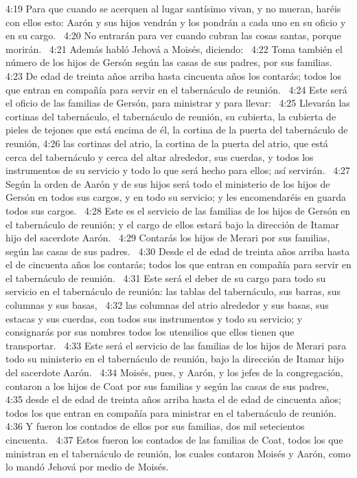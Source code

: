 4:19 Para que cuando se acerquen al lugar santísimo vivan, y no mueran, haréis con ellos esto: Aarón y sus hijos vendrán y los pondrán a cada uno en su oficio y en su cargo.  
4:20 No entrarán para ver cuando cubran las cosas santas, porque morirán.  
4:21 Además habló Jehová a Moisés, diciendo:  
4:22 Toma también el número de los hijos de Gersón según las casas de sus padres, por sus familias.  
4:23 De edad de treinta años arriba hasta cincuenta años los contarás; todos los que entran en compañía para servir en el tabernáculo de reunión.  
4:24 Este será el oficio de las familias de Gersón, para ministrar y para llevar:  
4:25 Llevarán las cortinas del tabernáculo, el tabernáculo de reunión, su cubierta, la cubierta de pieles de tejones que está encima de él, la cortina de la puerta del tabernáculo de reunión, 
4:26 las cortinas del atrio, la cortina de la puerta del atrio, que está cerca del tabernáculo y cerca del altar alrededor, sus cuerdas, y todos los instrumentos de su servicio y todo lo que será hecho para ellos; así servirán.  
4:27 Según la orden de Aarón y de sus hijos será todo el ministerio de los hijos de Gersón en todos sus cargos, y en todo su servicio; y les encomendaréis en guarda todos sus cargos.  
4:28 Este es el servicio de las familias de los hijos de Gersón en el tabernáculo de reunión; y el cargo de ellos estará bajo la dirección de Itamar hijo del sacerdote Aarón.  
4:29 Contarás los hijos de Merari por sus familias, según las casas de sus padres.  
4:30 Desde el de edad de treinta años arriba hasta el de cincuenta años los contarás; todos los que entran en compañía para servir en el tabernáculo de reunión.  
4:31 Este será el deber de su cargo para todo su servicio en el tabernáculo de reunión: las tablas del tabernáculo, sus barras, sus columnas y sus basas,  
4:32 las columnas del atrio alrededor y sus basas, sus estacas y sus cuerdas, con todos sus instrumentos y todo su servicio; y consignarás por sus nombres todos los utensilios que ellos tienen que transportar.  
4:33 Este será el servicio de las familias de los hijos de Merari para todo su ministerio en el tabernáculo de reunión, bajo la dirección de Itamar hijo del sacerdote Aarón.  
4:34 Moisés, pues, y Aarón, y los jefes de la congregación, contaron a los hijos de Coat por sus familias y según las casas de sus padres,  
4:35 desde el de edad de treinta años arriba hasta el de edad de cincuenta años; todos los que entran en compañía para ministrar en el tabernáculo de reunión.  
4:36 Y fueron los contados de ellos por sus familias, dos mil setecientos cincuenta.  
4:37 Estos fueron los contados de las familias de Coat, todos los que ministran en el tabernáculo de reunión, los cuales contaron Moisés y Aarón, como lo mandó Jehová por medio de Moisés.  
